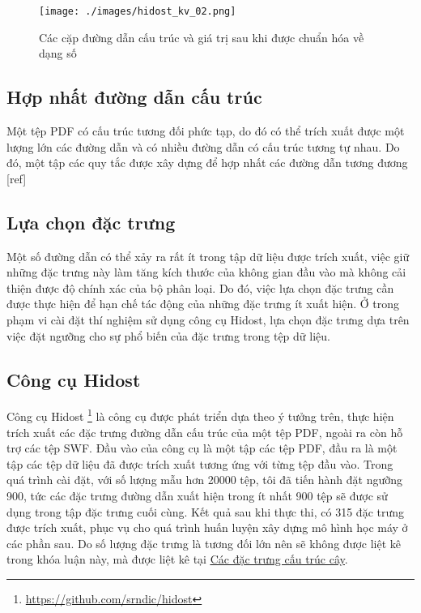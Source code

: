 \documentclass[./../main.tex]{subfiles}
\begin{document}
\begin{figure}[H]
	\centering
	\texttt{[image: ./images/hidost\_kv\_02.png]}
	\caption{Các cặp đường dẫn cấu trúc và giá trị sau khi được chuẩn hóa về dạng số}
	\label{fig:hidost_kv_02}
\end{figure}


\subsection*{Hợp nhất đường dẫn cấu trúc}
Một tệp PDF có cấu trúc tương đối phức tạp, do đó có thể trích xuất được một lượng lớn các đường dẫn và có nhiều đường dẫn có cấu trúc tương tự nhau. Do đó, một tập các quy tắc được xây dựng để hợp nhất các đường dẫn tương đương [ref]


\subsection*{Lựa chọn đặc trưng}
Một số đường dẫn có thể xảy ra rất ít trong tập dữ liệu được trích xuất, việc giữ những đặc trưng này làm tăng kích thước của không gian đầu vào mà không cải thiện được độ chính xác của bộ phân loại. Do đó, việc lựa chọn đặc trưng cần được thực hiện để hạn chế tác động của những đặc trưng ít xuất hiện. Ở trong phạm vi cài đặt thí nghiệm sử dụng công cụ Hidost, lựa chọn đặc trưng dựa trên việc đặt ngưỡng cho sự phổ biến của đặc trưng trong tệp dữ liệu.


\subsection*{Công cụ Hidost}
Công cụ Hidost \footnote{\url{https://github.com/srndic/hidost}} là công cụ được phát triển dựa theo ý tưởng trên, thực hiện trích xuất các đặc trưng đường dẫn cấu trúc của một tệp PDF, ngoài ra còn hỗ trợ các tệp SWF. Đầu vào của công cụ là một tập các tệp PDF, đầu ra là một tập các tệp dữ liệu đã được trích xuất tương ứng với từng tệp đầu vào. Trong quá trình cài đặt, với số lượng mẫu hơn 20000 tệp, tôi đã tiến hành đặt ngưỡng 900, tức các đặc trưng đường dẫn xuất hiện trong ít nhất 900 tệp sẽ được sử dụng trong tập đặc trưng cuối cùng. Kết quả sau khi thực thi, có 315 đặc trưng được trích xuất, phục vụ cho quá trình huấn luyện xây dựng mô hình học máy ở các phần sau. Do số lượng đặc trưng là tương đối lớn nên sẽ không được liệt kê trong khóa luận này, mà được liệt kê tại \href{https://docs.google.com/spreadsheets/d/1KLXWeywZy-YMoBGRXR1Oxle_OgLIHJUKCSUHza2meOc/edit#gid=0}{\underline{Các đặc trưng cấu trúc cây}}.
\end{document}
